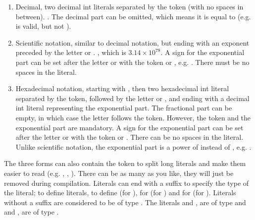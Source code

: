 \begin{enumerate}
  \setlength\itemsep{-4pt}
\item Decimal, two decimal int literals separated by the token  (with
  no spaces in between). . The decimal part can be omitted,
  which means it is equal to  (e.g.  is valid, but not
  ).

\item Scientific notation, similar to decimal notation, but ending with an
  exponent preceded by the letter  or . , which is \(3.14
  \times 10^{78}\). A sign for the exponential part can be set after the letter
   or  with the token \token{-} or \token{+}, e.g.
  . There must be no spaces in the literal.

\item Hexadecimal notation, starting with , then two hexadecimal int
  literal separated by the  token, followed by the letter 
  or , and ending with a decimal int literal representing the
  exponential part. The fractional part can be empty, in which case the letter
   follows the  token. However, the  token and the
   exponential part are mandatory. A sign for the exponential part can
  be set after the letter  or  with the token \token{-} or
  \token{+}. There can be no spaces in the literal. Unlike scientific notation,
  the exponential part is a power of  instead of , e.g.
  .

\end{enumerate}

The three forms can also contain the token \token{\_} to split long literals
and make them easier to read (e.g. ,
, ). There can be as many
\token{\_} as you like, they will just be removed during compilation. Literals
can end with a suffix to specify the type of the literal;  to define
 literals,  to define  (for ),
 for  (for ) and  for
 (for ). Literals without a suffix are considered to
be of type . The literals  and ,
 are of type  and  and
,  are of type .

